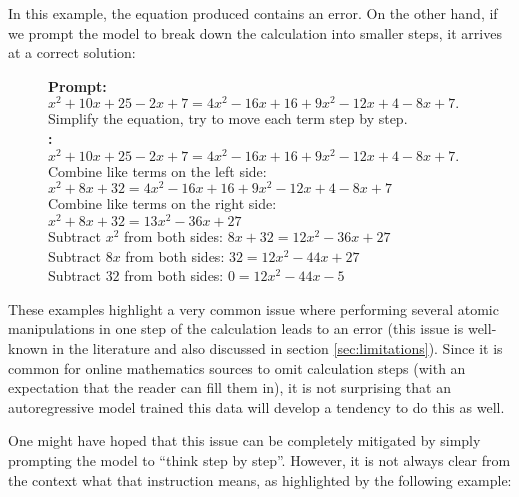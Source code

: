 In this example, the equation produced contains an error. On the other hand, if we prompt the model to break down the calculation into smaller steps, it arrives at a correct solution:
\begin{figure}[H]
\begin{AIbox}{\DV}
{\bf Prompt:} \\
{\scriptsize
$x^2 + 10x + 25 - 2x + 7 = 4x^2 - 16x + 16 + 9x^2 - 12x + 4 - 8x + 7.$\\
Simplify the equation, try to move each term step by step. 
}\\

{\bf \DV:} \\
{\scriptsize
$x^2 + 10x + 25 - 2x + 7 = 4x^2 - 16x + 16 + 9x^2 - 12x + 4 - 8x + 7.$\\
Combine like terms on the left side: $x^2 + 8x + 32 = 4x^2 - 16x + 16 + 9x^2 - 12x + 4 - 8x + 7$\\
Combine like terms on the right side: $x^2 + 8x + 32 = 13x^2 - 36x + 27$\\
Subtract $x^2$ from both sides: $8x + 32 = 12x^2 - 36x + 27$\\
Subtract $8x$ from both sides: $32 = 12x^2 - 44x + 27$\\
Subtract $32$ from both sides: $0 = 12x^2 - 44x - 5$\\
}
\end{AIbox}
\end{figure}

These examples highlight a very common issue where performing several atomic manipulations in one step of the calculation leads to an error (this issue is well-known in the literature and also discussed in section \ref{sec:limitations}). Since it is common for online mathematics sources to omit calculation steps (with an expectation that the reader can fill them in), it is not surprising that an autoregressive model trained this data will develop a tendency to do this as well.

One might have hoped that this issue can be completely mitigated by simply prompting the model to ``think step by step''. However, it is not always clear from the context what that instruction means, as highlighted by the following example:


